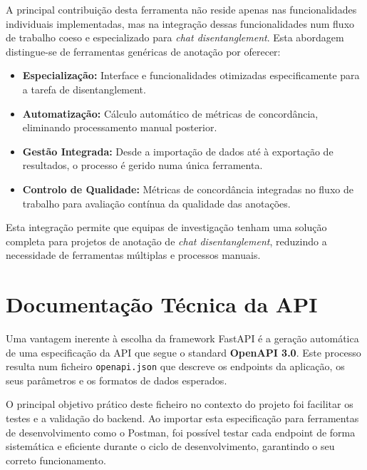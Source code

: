 A principal contribuição desta ferramenta não reside apenas nas funcionalidades individuais implementadas, mas na integração dessas funcionalidades num fluxo de trabalho coeso e especializado para \textit{chat disentanglement}. Esta abordagem distingue-se de ferramentas genéricas de anotação por oferecer:

\begin{itemize}
    \item \textbf{Especialização:} Interface e funcionalidades otimizadas especificamente para a tarefa de disentanglement.
    \item \textbf{Automatização:} Cálculo automático de métricas de concordância, eliminando processamento manual posterior.
    \item \textbf{Gestão Integrada:} Desde a importação de dados até à exportação de resultados, o processo é gerido numa única ferramenta.
    \item \textbf{Controlo de Qualidade:} Métricas de concordância integradas no fluxo de trabalho para avaliação contínua da qualidade das anotações.
\end{itemize}

Esta integração permite que equipas de investigação tenham uma solução completa para projetos de anotação de \textit{chat disentanglement}, reduzindo a necessidade de ferramentas múltiplas e processos manuais.

\section{Documentação Técnica da API}

Uma vantagem inerente à escolha da framework FastAPI é a geração automática de uma especificação da API que segue o standard \textbf{OpenAPI 3.0}. Este processo resulta num ficheiro \texttt{openapi.json} que descreve os endpoints da aplicação, os seus parâmetros e os formatos de dados esperados.

O principal objetivo prático deste ficheiro no contexto do projeto foi facilitar os testes e a validação do backend. Ao importar esta especificação para ferramentas de desenvolvimento como o Postman, foi possível testar cada endpoint de forma sistemática e eficiente durante o ciclo de desenvolvimento, garantindo o seu correto funcionamento.

